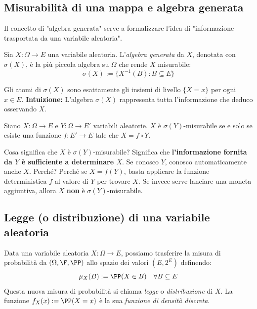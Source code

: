 \subsection{Misurabilità di una mappa e algebra generata}

Il concetto di "algebra generata" serve a formalizzare l'idea di "informazione trasportata da una variabile aleatoria".

\begin{definition}
Sia $X : \Omega \to E$ una variabile aleatoria. L'\emph{algebra generata} da $X$, denotata con $\sigma(X)$, è la più piccola algebra su $\Omega$ che rende $X$ misurabile:
\[ \sigma(X) := \{ X^{-1}(B) : B \subseteq E \} \]
\end{definition}

Gli atomi di $\sigma(X)$ sono esattamente gli insiemi di livello $\{X = x\}$ per ogni $x \in E$. 
\textbf{Intuizione:} L'algebra $\sigma(X)$ rappresenta tutta l'informazione che deduco osservando $X$.

\begin{theorem}
Siano $X : \Omega \to E$ e $Y : \Omega \to E'$ variabili aleatorie. 
$X$ è $\sigma(Y)$-misurabile se e solo se esiste una funzione $f : E' \to E$ tale che $X = f \circ Y$.
\end{theorem}

\begin{hint}
    Cosa significa che $X$ è $\sigma(Y)$-misurabile? 
    Significa che \textbf{l'informazione fornita da $Y$ è sufficiente a determinare $X$}. Se conosco $Y$, conosco automaticamente anche $X$. 
    Perché? Perché se $X = f(Y)$, basta applicare la funzione deterministica $f$ al valore di $Y$ per trovare $X$. Se invece serve lanciare una moneta aggiuntiva, allora $X$ \textbf{non} è $\sigma(Y)$-misurabile.
\end{hint}

\subsection{Legge (o distribuzione) di una variabile aleatoria}

\begin{definition}
Data una variabile aleatoria $X : \Omega \to E$, possiamo trasferire la misura di probabilità da $(\Omega, \F, \PP)$ allo spazio dei valori $(E, 2^E)$ definendo:
\[ \mu_X(B) := \PP(X \in B) \quad \forall B \subseteq E \]
Questa nuova misura di probabilità si chiama \emph{legge} o \emph{distribuzione} di $X$.
La funzione $f_X(x) := \PP(X = x)$ è la sua \emph{funzione di densità discreta}.
\end{definition}

